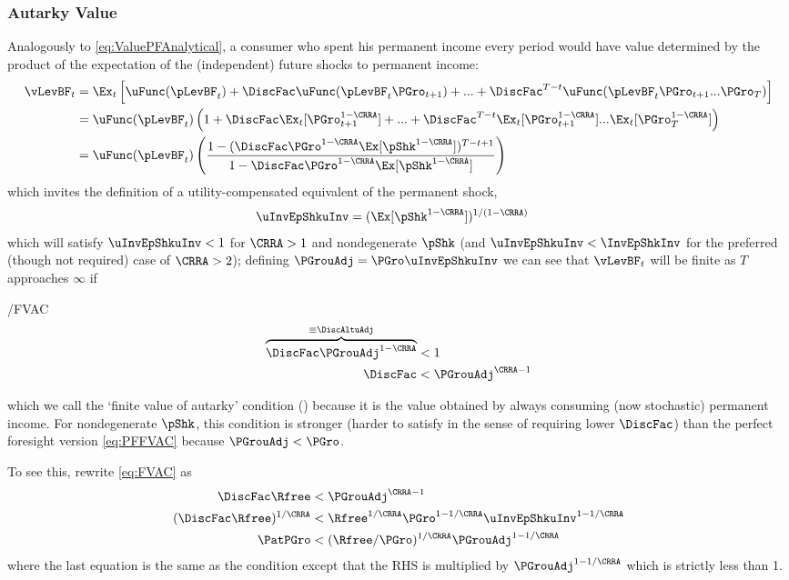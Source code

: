 \documentclass[./BufferStockTheory.tex]{subfiles}
\begin{document}
\subsubsection{Autarky Value}
Analogously to \eqref{eq:ValuePFAnalytical}, a consumer who spent his permanent income every period would have value determined by the product of the expectation of the (independent) future shocks to permanent income:
\begin{align*}
      \vLevBF_{t}  & = \Ex_{t}\left[\uFunc(\pLevBF_{t}) + \DiscFac \uFunc(\pLevBF_{t}\PGro_{t+1}) + ... + \DiscFac^{T-t}\uFunc(\pLevBF_{t}\PGro_{t+1}...\PGro_{T})\right] \\
       & = \uFunc(\pLevBF_{t})\left(1+ \DiscFac \Ex_{t}[\PGro_{t+1}^{1-\CRRA}] +  ... + \DiscFac^{T-t}\Ex_{t}[\PGro_{t+1}^{1-\CRRA}]...\Ex_{t}[\PGro_{T}^{1-\CRRA}]\right) \\
       & = \uFunc(\pLevBF_{t})\left(\frac{1-(\DiscFac \PGro^{1-\CRRA}\Ex[\pShk^{1-\CRRA}])^{T-t+1}}{1-\DiscFac \PGro^{1-\CRRA} \Ex[\pShk^{1-\CRRA}]}\right)
      \end{align*}
which invites the definition of a utility-compensated equivalent of the permanent shock,
\begin{align*}
  \uInvEpShkuInv  & = (\Ex[\pShk^{1-\CRRA}])^{1/(1-\CRRA)}
\end{align*}
which will satisfy $\uInvEpShkuInv < 1$ for $\CRRA>1$ and nondegenerate $\pShk$ (and $\uInvEpShkuInv < \InvEpShkInv$ for the preferred (though not required) case of $\CRRA > 2$); defining $\PGrouAdj=\PGro \uInvEpShkuInv$ we can see that $\vLevBF_{t}$ will be finite as $T$ approaches $\infty$ if


\hypertarget{FVAC}{}
\begin{verbatimwrite}{\EqDir/FVAC}
\begin{align}
\overbrace{\DiscFac \PGrouAdj^{1-\CRRA} }^{\equiv \DiscAltuAdj}  & < 1 \label{eq:FVAC}
\\ \DiscFac  & < \PGrouAdj^{\CRRA-1} \notag
\end{align}
\end{verbatimwrite}
 which we call the `finite value of autarky'
condition (\FVAC) because it is the value obtained by always consuming
(now stochastic) permanent income.  For nondegenerate $\pShk$, this condition is stronger
(harder to satisfy in the sense of requiring lower $\DiscFac$) than
the perfect foresight version \eqref{eq:PFFVAC} because $\PGrouAdj <
\PGro$.  

To see this, rewrite \eqref{eq:FVAC} as 
\begin{align}
 \DiscFac \Rfree & < \PGrouAdj^{\CRRA-1}
\\ (\DiscFac \Rfree)^{1/\CRRA}  & < \Rfree^{1/\CRRA} \PGro^{1-1/\CRRA} \uInvEpShkuInv^{1-1/\CRRA}
\\ \PatPGro & < (\Rfree/\PGro)^{1/\CRRA} \PGrouAdj^{1-1/\CRRA}
\end{align}
where the last equation is the same as the {\PFFVAC} condition except that the RHS is multiplied by $\PGrouAdj^{1-1/\CRRA}$ which is strictly less than 1.
\end{document}
